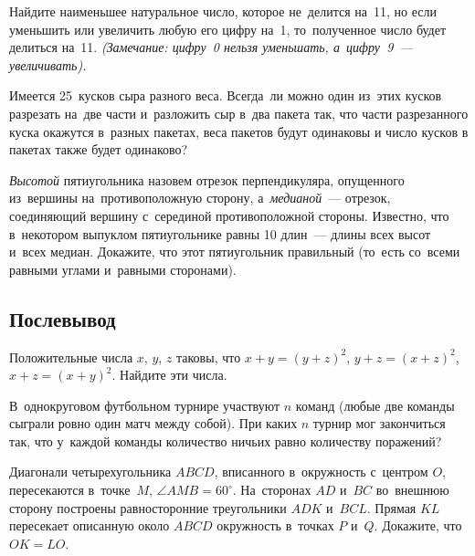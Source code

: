 \begin{problems}

\item
Найдите наименьшее натуральное число, которое не~делится на~11, но если
уменьшить или увеличить любую его цифру на~1, то~полученное число будет
делиться на~11. 
\emph{(Замечание: цифру~0 нельзя уменьшать, а~цифру~9~--- увеличивать).}

\item
Имеется 25~кусков сыра разного веса.
Всегда~ли можно один из~этих кусков разрезать на~две части и~разложить сыр
в~два пакета так, что части разрезанного куска окажутся в~разных пакетах,
веса пакетов будут одинаковы и число кусков в пакетах также будет одинаково?

\item
\emph{Высотой} пятиугольника назовем отрезок перпендикуляра, опущенного
из~вершины на~противоположную сторону,
а~\emph{медианой}~--- отрезок, соединяющий вершину с~серединой противоположной
стороны.
Известно, что в~некотором выпуклом пятиугольнике равны 10 длин~--- длины всех
высот и~всех медиан.
Докажите, что этот пятиугольник правильный
(то~есть со~всеми равными углами и~равными сторонами).

\end{problems}


\subsection*{Послевывод}

\begin{problems}

\item
Положительные числа $x$, $y$, $z$ таковы, что
$x + y = (y + z)^2$, $y + z = (x + z)^2$, $x + z = (x + y)^2$.
Найдите эти числа.

\item
В~однокруговом футбольном турнире участвуют $n$ команд
(любые две команды сыграли ровно один матч между собой).
При каких $n$ турнир мог закончиться так, что у~каждой команды количество
ничьих равно количеству поражений?

\item
Диагонали четырехугольника $ABCD$, вписанного в~окружность с~центром $O$,
пересекаются в~точке~$M$, $\angle AMB = 60^\circ$.
На~сторонах $AD$ и~$BC$ во~внешнюю сторону построены равносторонние
треугольники $ADK$ и~$BCL$.
Прямая $KL$ пересекает описанную около $ABCD$ окружность в~точках $P$ и~$Q$.
Докажите, что $OK = LO$.

\end{problems}


